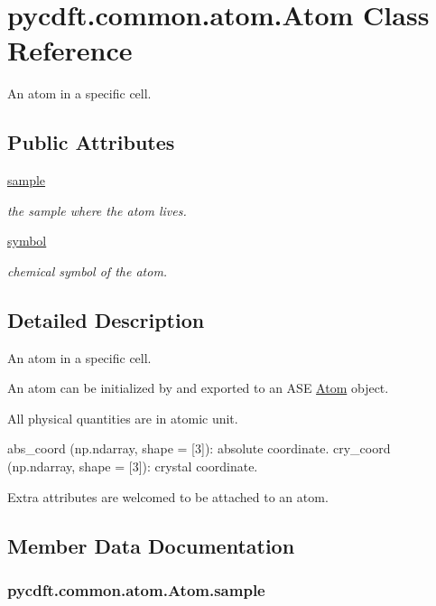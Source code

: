 \hypertarget{classpycdft_1_1common_1_1atom_1_1Atom}{\section{pycdft.\-common.\-atom.\-Atom Class Reference}
\label{classpycdft_1_1common_1_1atom_1_1Atom}
}


An atom in a specific cell.  


\subsection*{Public Attributes}
\begin{DoxyCompactItemize}
\item 
\hyperlink{classpycdft_1_1common_1_1atom_1_1Atom_a508301954501090af8ef01617184b12c}{sample}
\begin{DoxyCompactList}\small\item\em the sample where the atom lives. \end{DoxyCompactList}\item 
\hyperlink{classpycdft_1_1common_1_1atom_1_1Atom_a9ecd2653f6b1a9d6c3cbc7cea0db4002}{symbol}
\begin{DoxyCompactList}\small\item\em chemical symbol of the atom. \end{DoxyCompactList}\end{DoxyCompactItemize}


\subsection{Detailed Description}
An atom in a specific cell. 

An atom can be initialized by and exported to an A\-S\-E \hyperlink{classpycdft_1_1common_1_1atom_1_1Atom}{Atom} object.

All physical quantities are in atomic unit. \begin{DoxyVerb}abs_coord (np.ndarray, shape = [3]): absolute coordinate.
cry_coord (np.ndarray, shape = [3]): crystal coordinate.
\end{DoxyVerb}


Extra attributes are welcomed to be attached to an atom. 

\subsection{Member Data Documentation}
\hypertarget{classpycdft_1_1common_1_1atom_1_1Atom_a508301954501090af8ef01617184b12c}{
\subsubsection[{sample}]{\setlength{\rightskip}{0pt plus 5cm}pycdft.\-common.\-atom.\-Atom.\-sample}}\label{classpycdft_1_1common_1_1atom_1_1Atom_a508301954501090af8ef01617184b12c}


